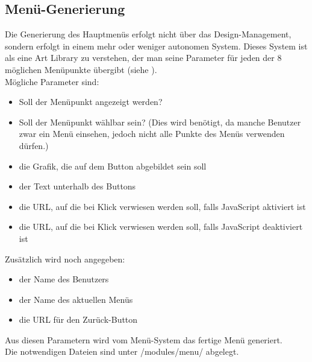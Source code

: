 \subsection{Menü-Generierung}
Die Generierung des Hauptmenüs erfolgt nicht über das Design-Management, sondern erfolgt in einem mehr oder weniger autonomen System. Dieses System ist als eine Art Library zu verstehen, der man seine Parameter für jeden der 8 möglichen Menüpunkte übergibt (siehe ).\\
Mögliche Parameter sind:
\begin{itemize}
	\item Soll der Menüpunkt angezeigt werden?
	\item Soll der Menüpunkt wählbar sein? (Dies wird benötigt, da manche Benutzer zwar ein Menü einsehen, jedoch nicht alle Punkte des Menüs verwenden dürfen.)
	\item die Grafik, die auf dem Button abgebildet sein soll
	\item der Text unterhalb des Buttons
	\item die URL, auf die bei Klick verwiesen werden soll, falls JavaScript aktiviert ist
	\item die URL, auf die bei Klick verwiesen werden soll, falls JavaScript deaktiviert ist
\end{itemize}
Zusätzlich wird noch angegeben:
\begin{itemize}
	\item der Name des Benutzers
	\item der Name des aktuellen Menüs
	\item die URL für den Zurück-Button
\end{itemize}
Aus diesen Parametern wird vom Menü-System das fertige Menü generiert.\\
Die notwendigen Dateien sind unter /modules/menu/ abgelegt.